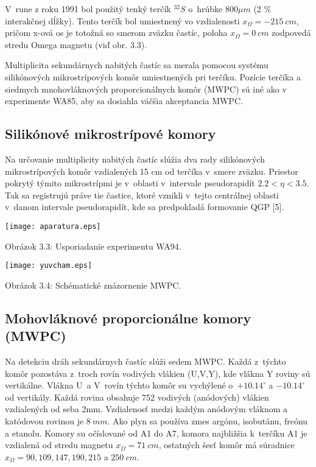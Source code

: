 V~rune z roku 1991 bol použitý tenký terčík $^{32}S$ o~hrúbke $800 \mu m$ (2
\% interakčnej dĺžky). Tento terčík bol umiestnený vo vzdialenosti
$x_{\Omega}=-215 \: cm$, pričom x-ová os je totožná so smerom zväzku
častíc, poloha $x_{\Omega}=0 \: cm$ zodpovedá stredu Omega magnetu (viď obr.
3.3).

Multiplicita sekundárnych nabitých častíc sa merala pomocou systému
silikónových mikrostrípových komôr umiestnených pri terčíku.
Pozície terčíka a siedmych mnohovláknových proporcionálnych komôr (MWPC) sú
iné ako v experimente WA85, aby sa dosiahla väčšia  akceptancia
MWPC.

\subsection{Silikónové mikrostrípové komory}
Na určovanie multiplicity nabitých častíc slúžia dva rady silikónových
mikrostrípových  komôr vzdialených 15 cm od terčíka v~smere zväzku.
Priestor pokrytý týmito mikrostrípmi je v~oblasti v~intervale pseudorapidít
$2.2 < \eta < 3.5$.
Tak sa registrujú práve tie častice,
ktoré vznikli v~tejto centrálnej oblasti v~danom intervale pseudorapidít,
kde sa predpokladá formovanie QGP [5].

\newpage
\begin{center}
  \texttt{[image: aparatura.eps]}
\end{center}
\begin{center}
  Obrázok 3.3: Usporiadanie experimentu WA94.
\end{center}

\newpage

\begin{center}
  \texttt{[image: yuvcham.eps]}
\end{center}
\begin{center}
  Obrázok 3.4: Schématické znázornenie MWPC.
\end{center}

\subsection{Mohovláknové proporcionálne komory (MWPC)}
Na detekciu dráh sekundárnych častíc slúži sedem
MWPC. Každá z~týchto komôr pozostáva z~troch rovín vodivých vlákien (U,V,Y),
kde vlákna Y roviny sú vertikálne. Vlákna U~a V~rovín
týchto komôr su vychýlené o~$+10.14^{\circ}$ a $-10.14^{\circ}$ od vertikály.
Každá rovina obsahuje 752 vodivých (anódových) vlákien  vzdialených od seba
2mm. Vzdialenosť medzi každým anódovým vláknom a katódovou rovinou je $8\:
mm$. Ako plyn sa používa zmes argónu, isobutánu, freónu a etanolu. Komory su
očíslované od A1 do A7, komora najbližšia k~terčíku A1 je vzdialená od stredu
magnetu $x_{\Omega}=71\: cm$, ostatných šesť komôr má súradnice
$x_{\Omega}=90, 109, 147, 190, 215$ a $250\: cm$.

